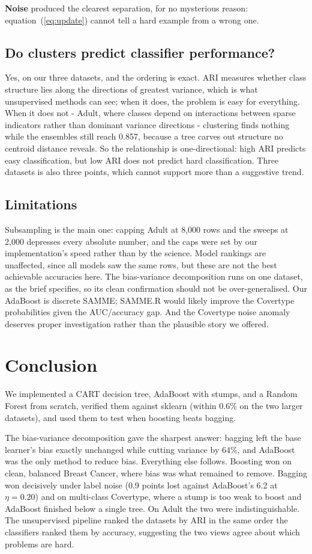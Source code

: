 \documentclass[conference]{IEEEtran}
\begin{document}
\textbf{Noise} produced the clearest separation, for no mysterious reason:
equation~(\ref{eq:update}) cannot tell a hard example from a wrong one.

\subsection{Do clusters predict classifier performance?}
Yes, on our three datasets, and the ordering is exact.  ARI measures
whether class structure lies along the directions of greatest variance,
which is what unsupervised methods can see; when it does, the problem is
easy for everything.  When it does not - Adult, where classes depend on
interactions between sparse indicators rather than dominant variance
directions - clustering finds nothing while the ensembles still reach
0.857, because a tree carves out structure no centroid distance reveals.
So the relationship is one-directional: high ARI predicts easy
classification, but low ARI does not predict hard classification.  Three
datasets is also three points, which cannot support more than a suggestive
trend.

\subsection{Limitations}
Subsampling is the main one: capping Adult at 8{,}000 rows and the sweeps
at 2{,}000 depresses every absolute number, and the caps were set by our
implementation's speed rather than by the science.  Model rankings are
unaffected, since all models saw the same rows, but these are not the best
achievable accuracies here.  The bias-variance decomposition runs on one
dataset, as the brief specifies, so its clean confirmation should not be
over-generalised.  Our AdaBoost is discrete SAMME; SAMME.R would likely
improve the Covertype probabilities given the AUC/accuracy gap.  And the
Covertype noise anomaly deserves proper investigation rather than the
plausible story we offered.

\section{Conclusion}
\label{sec:conclusion}
We implemented a CART decision tree, AdaBoost with stumps, and a Random
Forest from scratch, verified them against sklearn (within 0.6\% on the two
larger datasets), and used them to test when boosting beats bagging.

The bias-variance decomposition gave the sharpest answer: bagging left the
base learner's bias exactly unchanged while cutting variance by 64\%, and
AdaBoost was the only method to reduce bias.  Everything else follows.
Boosting won on clean, balanced Breast Cancer, where bias was what remained
to remove.  Bagging won decisively under label noise (0.9 points lost
against AdaBoost's 6.2 at $\eta=0.20$) and on multi-class Covertype, where
a stump is too weak to boost and AdaBoost finished below a single tree.  On
Adult the two were indistinguishable.  The unsupervised pipeline ranked the
datasets by ARI in the same order the classifiers ranked them by accuracy,
suggesting the two views agree about which problems are hard.
\end{document}
